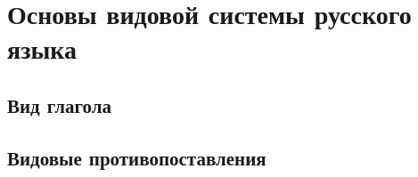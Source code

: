 \section{Основы видовой системы русского языка}




\subsection{Вид глагола}

\subsection{Видовые противопоставления}

